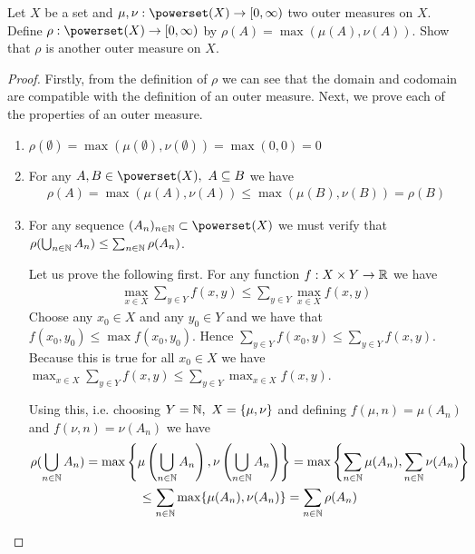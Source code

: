 \begin{ex}
	Let $X$ be a set and $\mu, \nu:\powerset(X) \to [0, \infty)$ two outer measures on $X$. Define $\rho: \powerset(X) \to [0, \infty)$ by $\rho(A) = \max(\mu(A), \nu(A))$. Show that $\rho$ is another outer measure on $X$.
\end{ex}

\begin{proof}
	Firstly, from the definition of $\rho$ we can see that the domain and codomain are compatible with the definition of an outer measure. Next, we prove each of the properties of an outer measure.
	\begin{enumerate}
		\item $\rho(\emptyset) = \max(\mu(\emptyset), \nu(\emptyset)) = \max (0, 0) = 0$
		\item For any $A, B \in \powerset(X),\ A \subseteq B$ we have
		\begin{align*}
			\rho(A) =\max(\mu(A), \nu(A)) \leq \max (\mu(B), \nu(B)) = \rho(B)
		\end{align*}
		\item For any sequence $(A_n)_{n\in \N} \subset \powerset(X)$ we must verify that $\rho(\bigcup_{n \in \mathbb{N}} A_n) \leq \sum_{n\in \mathbb{N}} \rho(A_n)$.
		
		Let us prove the following first. For any function $f: X \times Y \to \mathbb{R}$ we have
		\begin{align*}
			\max_{x \in X} \sum_{y \in Y} f(x, y) \leq \sum_{y \in Y} \max_{x \in X} f(x, y)
		\end{align*}
		Choose any $x_0 \in X$ and any $y_0 \in Y$ and we have that $f(x_0, y_0) \leq \max f(x_0, y_0)$. Hence $\sum_{y \in Y} f(x_0, y) \leq \sum_{y \in Y} f(x, y)$. Because this is true for all $x_0 \in X$ we have $\max_{x \in X} \sum_{y \in Y} f(x, y) \leq \sum_{y \in Y} \max_{x \in X} f(x,y)$.
		
		Using this, i.e. choosing $Y = \mathbb{N},\ X = \{\mu, \nu\}$ and defining $f(\mu, n) = \mu(A_n)$ and $f(\nu, n) = \nu(A_n)$ we have
		\begin{multline*}
			\rho(\bigcup_{n \in \mathbb{N}} A_n) = \max\left\{\mu\left(\bigcup_{n \in \mathbb{N}} A_n\right), \nu\left(\bigcup_{n \in \mathbb{N}} A_n\right) \right\} = \max \left\{\sum_{n\in \mathbb{N}} \mu(A_n), \sum_{n\in \mathbb{N}} \nu(A_n) \right\} \\
			\leq \sum_{n\in \mathbb{N}} \max\{\mu(A_n), \nu(A_n)\} = \sum_{n\in \mathbb{N}} \rho(A_n)
		\end{multline*}
	\end{enumerate}
\end{proof}


